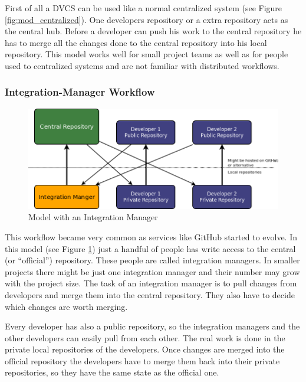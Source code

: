 First of all a DVCS can be used like a normal centralized system (see Figure \ref{fig:mod_centralized}). One developers repository or a extra repository acts as the central hub. Before a developer can push his work to the central repository he has to merge all the changes done to the central repository into his local repository. This model works well for small project teams as well as for people used to centralized systems and are not familiar with distributed workflows.


\subsubsection{Integration-Manager Workflow}

\begin{figure}[tbp]
  \centering
  \includegraphics[width=\textwidth]{img/Mod_IntegrationManager}
  \caption{Model with an Integration Manager}
  \label{fig:mod_intMan} 
\end{figure}

This workflow became very common as services like GitHub started to evolve. In
this model (see Figure \ref{fig:mod_intMan}) just a handful of people has write access to the central (or “official”) repository. 
These people are called integration managers. In smaller projects there might be just one integration manager and their 
number may grow with the project size. The task of an integration manager is to pull changes from developers and merge 
them into the central repository. They also have to decide which changes are worth merging.

Every developer has also a public repository, so the integration managers and the other developers can easily pull from 
each other. The real work is done in the private local repositories of the developers. Once changes are merged into the 
official repository the developers have to merge them back into their private repositories, so they have the same state as the official one.

